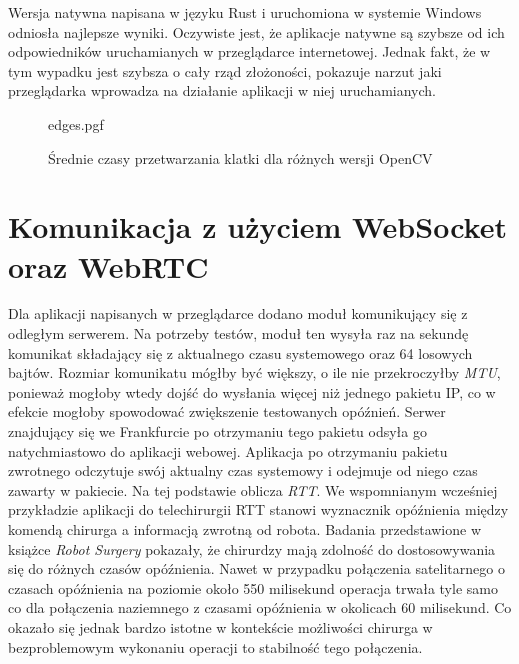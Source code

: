 \documentclass[language=polish,type=master]{aghmodern}
\begin{document}
Wersja natywna napisana w języku Rust i uruchomiona w systemie Windows odniosła najlepsze wyniki.
Oczywiste jest, że aplikacje natywne są szybsze od ich odpowiedników uruchamianych w przeglądarce internetowej.
Jednak fakt, że w tym wypadku jest szybsza o cały rząd złożoności, pokazuje narzut jaki przeglądarka wprowadza na działanie aplikacji w niej uruchamianych.

\begin{figure}[H]
    \centering
    {edges.pgf}
    \caption{Średnie czasy przetwarzania klatki dla różnych wersji OpenCV}
    \label{fig:edges}
\end{figure}

\section{Komunikacja z użyciem WebSocket oraz WebRTC}
Dla aplikacji napisanych w przeglądarce dodano moduł komunikujący się z odległym serwerem.
Na potrzeby testów, moduł ten wysyła raz na sekundę komunikat składający się z aktualnego czasu systemowego oraz 64 losowych bajtów.
Rozmiar komunikatu mógłby być większy, o ile nie przekroczyłby \emph{MTU}\footnotemark{}, ponieważ mogłoby wtedy dojść do wysłania więcej niż jednego pakietu IP, co w efekcie mogłoby spowodować zwiększenie testowanych opóźnień.
Serwer znajdujący się we Frankfurcie po otrzymaniu tego pakietu odsyła go natychmiastowo do aplikacji webowej.
Aplikacja po otrzymaniu pakietu zwrotnego odczytuje swój aktualny czas systemowy i odejmuje od niego czas zawarty w pakiecie.
Na tej podstawie oblicza \emph{RTT}\footnotemark{}.
We wspomnianym wcześniej przykładzie aplikacji do telechirurgii RTT stanowi wyznacznik opóźnienia między komendą chirurga a informacją zwrotną od robota.
Badania przedstawione w książce \emph{Robot Surgery} \cite{telesurgery} pokazały, że chirurdzy mają zdolność do dostosowywania się do różnych czasów opóźnienia.
Nawet w przypadku połączenia satelitarnego o czasach opóźnienia na poziomie około 550 milisekund operacja trwała tyle samo co dla połączenia naziemnego z czasami opóźnienia w okolicach 60 milisekund.
Co okazało się jednak bardzo istotne w kontekście możliwości chirurga w bezproblemowym wykonaniu operacji to stabilność tego połączenia.
\end{document}
